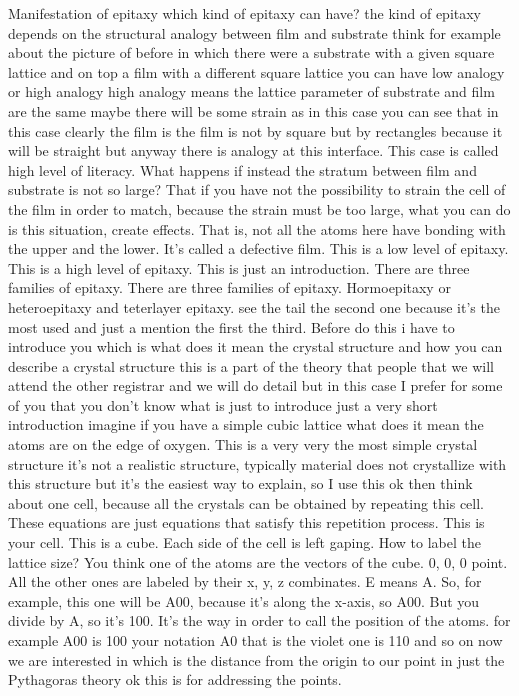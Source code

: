Manifestation of epitaxy which kind of epitaxy can have? the kind of epitaxy depends on the structural analogy between film and substrate think for example about the picture of before in which there were a substrate with a given square lattice and on top a film with a different square lattice you can have low analogy or high analogy high analogy means the lattice parameter of substrate and film are the same maybe there will be some strain as in this case you can see that in this case clearly the film is the film is not by square but by rectangles because it will be straight but anyway there is analogy at this interface. This case is called high level of literacy. What happens if instead the stratum between film and substrate is not so large? That if you have not the possibility to strain the cell of the film in order to match, because the strain must be too large, what you can do is this situation, create effects. That is, not all the atoms here have bonding with the upper and the lower. It's called a defective film. This is a low level of epitaxy. This is a high level of epitaxy. This is just an introduction. There are three families of epitaxy. There are three families of epitaxy. Hormoepitaxy or heteroepitaxy and teterlayer epitaxy. see the tail the second one because it's the most used and just a mention the first the third.
Before do this i have to introduce you which is what does it mean the crystal structure and how you can describe a crystal structure this is a part of the theory that people that we will attend the other registrar and we will do detail but in this case I prefer for some of you that you don't know what is just to introduce just a very short introduction imagine if you have a simple cubic lattice what does it mean the atoms are on the edge of oxygen. This is a very very the most simple crystal structure it's not a realistic structure, typically material does not crystallize with this structure but it's the easiest way to explain, so I use this ok then think about one cell, because all the crystals can be obtained by repeating this cell. These equations are just equations that satisfy this repetition process. This is your cell. This is a cube. Each side of the cell is left gaping. How to label the lattice size? You think one of the atoms are the vectors of the cube. 0, 0, 0 point. All the other ones are labeled by their x, y, z combinates. E means A. So, for example, this one will be A00, because it's along the x-axis, so A00. But you divide by A, so it's 100. It's the way in order to call the position of the atoms. for example A00 is 100 your notation A0 that is the violet one is 110 and so on now we are interested in which is the distance from the origin to our point in just the Pythagoras theory ok this is for addressing the points.
